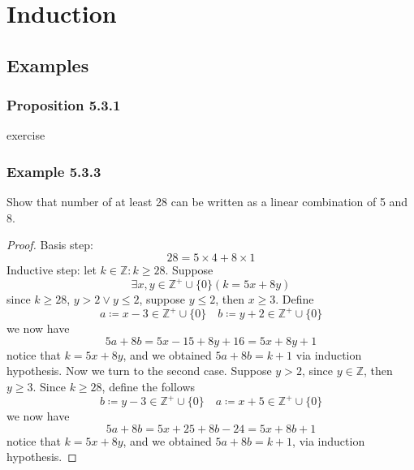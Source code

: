 \documentclass[12pt]{book}
\newcommand{\Z}{\mathbb{Z}}
\newcommand{\paren}[1]{\left( #1 \right)}
\newcommand{\zero}{\{0\}}
\begin{document}
\section{Induction}

\subsection{Examples}
\subsubsection{Proposition 5.3.1}
exercise

\subsubsection{Example 5.3.3}
Show that number of at least 28 can be written as a linear combination of 5 and 8.

\begin{proof}
    Basis step:
    \[
    28 = 5\times 4 + 8 \times 1
    \]
    Inductive step: let $k \in \Z : k \geq 28$. Suppose 
    \[
    \exists x,y \in \Z^+ \cup \zero
    \paren{k = 5x+8y}
    \]
    since $k \geq 28$, $y > 2 \vee y \leq 2$, suppose $y \leq 2$, then $x\geq 3$. Define 
    \[
    a \coloneqq x-3 \in \Z^+ \cup \zero \quad b\coloneqq y +2 \in \Z^+ \cup \zero
    \]
    we now have 
    \[
    5a + 8b = 5x-15 + 8y+16 = 5x+8y +1
    \]
    notice that $k = 5x+8y$, and we obtained $5a+8b = k+1$ via induction hypothesis. Now we turn to the second case. Suppose $y > 2$, since $y \in \Z$, then $y \geq 3$. Since $k \geq 28$, define the follows
    \[
    b \coloneqq y-3 \in \Z^+ \cup \zero \quad a \coloneqq x+5 \in \Z^+ \cup \zero
    \]
    we now have
    \[
    5a+8b = 5x+25+8b-24 = 5x+8b +1
    \]
    notice that $k = 5x+8y$, and we obtained $5a+8b = k+1$, via induction hypothesis.
    
    
\end{proof}
\end{document}
